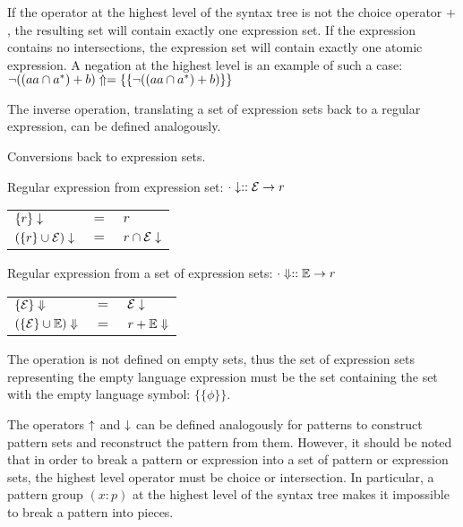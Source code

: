 If the operator at the highest level of the syntax tree is not the choice
operator $+$, the resulting set will contain exactly one expression set. If the
expression contains no intersections, the expression set will contain exactly
one atomic expression. A negation at the highest level is an example of such a
case: $\neg((aa \cap a^*) + b)\Uparrow = \{\{\neg((aa \cap a^*) + b)\}\}$

The inverse operation, translating a set of expression sets back to a regular
expression, can be defined analogously.

\begin{defn}
   Conversions back to expression sets.

   Regular expression from expression set: $\cdot\downarrow :: \mathcal{E} \to r$

   \begin{tabular}{lll}
      $\{r\}\downarrow$			& $=$	& $r$				\\
      $(\{r\} \cup \mathcal{E})\downarrow$	& $=$	& $r \cap \mathcal{E}\downarrow$	\\
   \end{tabular}

   Regular expression from a set of expression sets: $\cdot\Downarrow :: \mathbb{E} \to r$

   \begin{tabular}{lll}
      $\{\mathcal{E}\}\Downarrow$		& $=$	& $\mathcal{E}\downarrow$		\\
      $(\{\mathcal{E}\} \cup \mathbb{E})\Downarrow$	& $=$	& $r + \mathbb{E}\Downarrow$	\\
   \end{tabular}
\end{defn}

The operation is not defined on empty sets, thus the set of expression sets
representing the empty language expression must be the set containing the set
with the empty language symbol: $\{\{\phi\}\}$.

The operators $\uparrow$ and $\downarrow$ can be defined analogously for
patterns to construct pattern sets and reconstruct the pattern from them.
However, it should be noted that in order to break a pattern or expression into
a set of pattern or expression sets, the highest level operator must be choice
or intersection. In particular, a pattern group $(x:p)$ at the highest level of
the syntax tree makes it impossible to break a pattern into pieces.


